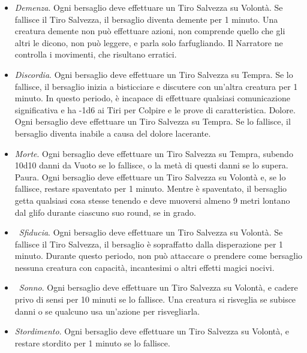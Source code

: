 \begin{multicols}{2}
\medskip
\begin{itemize}
\item
\textit{Demenza}. Ogni bersaglio deve effettuare un Tiro Salvezza su Volontà. Se fallisce il Tiro Salvezza, il bersaglio diventa demente per 1 minuto. Una creatura demente non può effettuare azioni, non comprende quello che gli altri le dicono, non può leggere, e parla solo farfugliando. Il Narratore ne controlla i movimenti, che risultano erratici.\\
\item
\textit{Discordia}. Ogni bersaglio deve effettuare un Tiro Salvezza su Tempra. Se lo fallisce, il bersaglio inizia a bisticciare e discutere con un'altra creatura per 1 minuto. In questo periodo, è incapace di effettuare qualsiasi comunicazione significativa e ha -1d6 ai Tiri per Colpire e le prove di caratteristica. Dolore. Ogni bersaglio deve effettuare un Tiro Salvezza su Tempra. Se lo fallisce, il bersaglio diventa inabile a causa del dolore lacerante.
\item
\textit{Morte}. Ogni bersaglio deve effettuare un Tiro Salvezza su Tempra, subendo 10d10 danni da Vuoto se lo fallisce, o la metà di questi danni se lo supera. Paura. Ogni bersaglio deve effettuare un Tiro Salvezza su Volontà e, se lo fallisce, restare spaventato per 1 minuto. Mentre è spaventato, il bersaglio getta qualsiasi cosa stesse tenendo e deve muoversi almeno 9 metri lontano dal glifo durante ciascuno suo round, se in grado.
\item\
\textit{Sfiducia}. Ogni bersaglio deve effettuare un Tiro Salvezza su Volontà. Se fallisce il Tiro Salvezza, il bersaglio è sopraffatto dalla disperazione per 1 minuto. Durante questo periodo, non può attaccare o prendere come bersaglio nessuna creatura con capacità, incantesimi o altri effetti magici nocivi.
\item\
\textit{Sonno}. Ogni bersaglio deve effettuare un Tiro Salvezza su Volontà, e cadere privo di sensi per 10 minuti se lo fallisce. Una creatura si risveglia se subisce danni o se qualcuno usa un'azione per risvegliarla. 
\item
\textit{Stordimento}. Ogni bersaglio deve effettuare un Tiro Salvezza su Volontà, e restare stordito per 1 minuto se lo fallisce.
\end{itemize}


\end{multicols}

